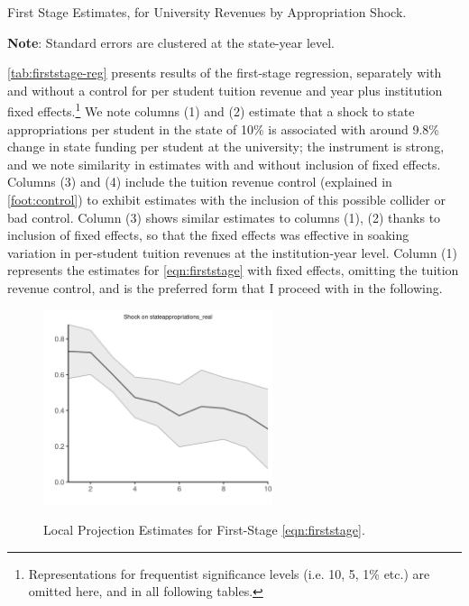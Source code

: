 \documentclass[notitlepage,12pt]{article}
\begin{document}
\begin{table}[h!]
    \singlespacing
    \centering
    \caption{First Stage Estimates, for University Revenues by Appropriation Shock.}
    \makebox[\textwidth][c]{}
    \label{tab:firststage-reg}
    \begin{flushleft}
        \footnotesize
        \textbf{Note}: Standard errors are clustered at the state-year level.
    \end{flushleft}
\end{table}

\autoref{tab:firststage-reg} presents results of the first-stage regression, separately with and without a control for per student tuition revenue and year plus institution fixed effects.\footnote{
    Representations for frequentist significance levels (i.e. 10, 5, 1\% etc.) are omitted here, and in all following tables.
}
We note columns (1) and (2) estimate that a shock to state appropriations per student in the state of 10\% is associated with around 9.8\% change in state funding per student at the university; the instrument is strong, and we note similarity in estimates with and without inclusion of fixed effects.
Columns (3) and (4) include the tuition revenue control (explained in \autoref{foot:control}) to exhibit estimates with the inclusion of this possible collider or bad control.
Column (3) shows similar estimates to columns (1), (2) thanks to inclusion of fixed effects, so that the fixed effects was effective in soaking variation in per-student tuition revenues at the institution-year level.
Column (1) represents the estimates for \autoref{eqn:firststage} with fixed effects, omitting the tuition revenue control, and is the preferred form that I proceed with in the following.

\begin{figure}[h!]
    \centering
    \singlespacing
    \caption{Local Projection Estimates for First-Stage \autoref{eqn:firststage}.}
    \includegraphics[width=0.6\textwidth]{figures/firststage-lp.png}
    \label{fig:firststage-lp}
\end{figure}
\end{document}
